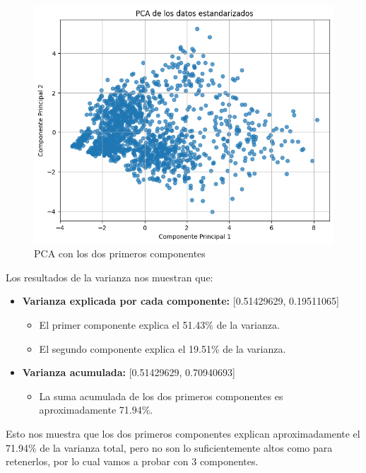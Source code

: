 \begin{figure}[h!]
    \centering
    \includegraphics[width=1\textwidth]{images/pca-2-components.png}
    \caption{PCA con los dos primeros componentes}
    \label{fig:pca_2_components}
\end{figure}

Los resultados de la varianza nos muestran que:    
\begin{itemize}
    \item \textbf{Varianza explicada por cada componente:} [0.51429629, 0.19511065]
    \begin{itemize}
        \item El primer componente explica el 51.43\% de la varianza.
        \item El segundo componente explica el 19.51\% de la varianza.
    \end{itemize}

    \item \textbf{Varianza acumulada:} [0.51429629, 0.70940693]
    \begin{itemize}
        \item La suma acumulada de los dos primeros componentes es aproximadamente 71.94\%.
    \end{itemize}
\end{itemize}

Esto nos muestra que los dos primeros componentes explican aproximadamente el 71.94\% de la varianza total, 
pero no son lo suficientemente altos como para retenerlos, por lo cual vamos a probar con 3 componentes.

